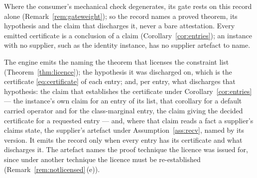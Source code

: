 
Where the consumer's mechanical check degenerates, its gate rests on this
record alone (Remark~\ref{rem:gateweight}); so the record names a proved
theorem, its hypothesis and the claim that discharges it, never a bare
attestation. Every emitted certificate is a conclusion of a claim
(Corollary~\ref{cor:entries}); an instance with no supplier, such as the
identity instance, has no supplier artefact to name.

\begin{requirement}\label{req:licence-record}
The engine emits the   naming
the theorem that licenses the constraint list (Theorem~\ref{thm:licence});
the hypothesis it was discharged on, which is the certificate
\eqref{eq:certificate} of each entry; and, per entry, what discharges that
hypothesis: the claim that establishes the certificate under
Corollary~\ref{cor:entries} --- the instance's own claim for an entry of its
list, that corollary for a default carried operator and for the
class-marginal entry, the claim giving the decided certificate for a
requested entry --- and, where that claim reads a fact a supplier's claims
state, the supplier's artefact under Assumption~\ref{ass:recv}, named by its
version. It emits the record only when every entry has its certificate and
what discharges it. The artefact names the proof technique the licence was
issued for, since under another technique the licence must be re-established
(Remark~\ref{rem:notlicensed}\,(e)).
\end{requirement}

